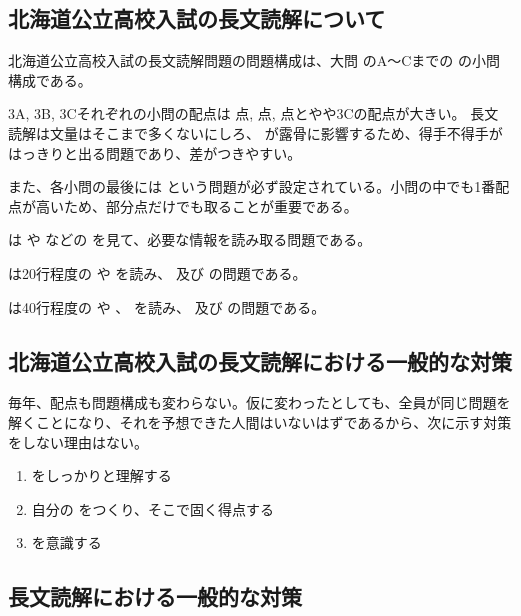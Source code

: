 \subsection{北海道公立高校入試の長文読解について}

北海道公立高校入試の長文読解問題の問題構成は、大問  のA〜Cまでの  の小問構成である。

3A, 3B, 3Cそれぞれの小問の配点は 点,  点,  点とやや3Cの配点が大きい。
長文読解は文量はそこまで多くないにしろ、 が露骨に影響するため、得手不得手がはっきりと出る問題であり、差がつきやすい。

また、各小問の最後には  という問題が必ず設定されている。小問の中でも1番配点が高いため、部分点だけでも取ることが重要である。

 は  や  などの  を見て、必要な情報を読み取る問題である。

 は20行程度の  や  を読み、 及び  の問題である。

 は40行程度の  や 、  を読み、 及び  の問題である。

\subsection{北海道公立高校入試の長文読解における一般的な対策}

毎年、配点も問題構成も変わらない。仮に変わったとしても、全員が同じ問題を解くことになり、それを予想できた人間はいないはずであるから、次に示す対策をしない理由はない。

\begin{enumerate}
    \item {} をしっかりと理解する
    \item 自分の  をつくり、そこで固く得点する
    \item {} を意識する
\end{enumerate}

\subsection{長文読解における一般的な対策}

